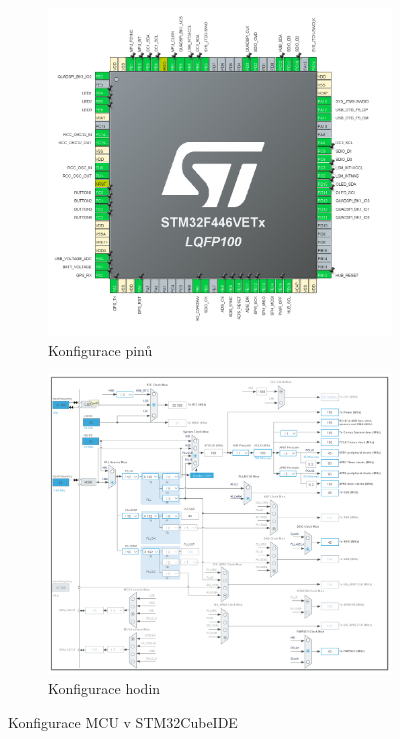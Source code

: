 \begin{figure}[h]
     \centering
     \begin{subfigure}[b]{0.4\textwidth}
         \centering
         \includegraphics[width=\textwidth]{obrazky/cubePinout}
         \caption{Konfigurace pinů}
       
     \end{subfigure}
     \hfill
     \begin{subfigure}[b]{0.4\textwidth}
         \centering
         \includegraphics[width=\textwidth]{obrazky/cubeClock}
         \caption{Konfigurace hodin}
         
     \end{subfigure}
        \caption{Konfigurace MCU v STM32CubeIDE}
        \label{fig:cubeConfig}
\end{figure}

